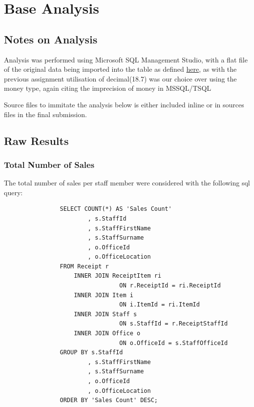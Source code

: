 \documentclass{article}
\begin{document}
            \newpage

    \section{Base Analysis}
    \label{sec:BA}

        \subsection{Notes on Analysis}
            Analysis was performed using Microsoft SQL Management Studio,
            with a flat file of the original data being imported into 
            the table as defined \hyperref[sec:ETL]{\color{blue}here},
            as with the previous assignment utilisation of decimal(18.7) was our choice over using the money type, again citing
            the imprecision of money in MSSQL/TSQL\cite{MoneyIssues}

            Source files to immitate the analysis below is either included inline or in sources files in the final submission.


            \subsection{Raw Results}

            \subsubsection{Total Number of Sales}
                The total number of sales per staff member were considered with the following 
                sql query:
                \begin{lstlisting}
				SELECT COUNT(*) AS 'Sales Count'
						, s.StaffId
						, s.StaffFirstName
						, s.StaffSurname
						, o.OfficeId
						, o.OfficeLocation
				FROM Receipt r
					INNER JOIN ReceiptItem ri
								 ON r.ReceiptId = ri.ReceiptId
					INNER JOIN Item i
								 ON i.ItemId = ri.ItemId
					INNER JOIN Staff s
								 ON s.StaffId = r.ReceiptStaffId
					INNER JOIN Office o
								 ON o.OfficeId = s.StaffOfficeId
				GROUP BY s.StaffId
						, s.StaffFirstName
						, s.StaffSurname
						, o.OfficeId
						, o.OfficeLocation
				ORDER BY 'Sales Count' DESC;
                \end{lstlisting}
\end{document}
